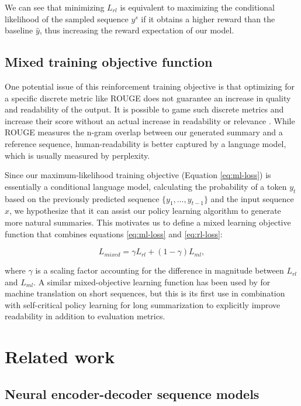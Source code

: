 We can see that minimizing $L_{rl}$ is equivalent to maximizing the conditional likelihood of the sampled sequence $y^{s}$ if it obtains a higher reward than the baseline $\hat{y}$, thus increasing the reward expectation of our model.

\subsection{Mixed training objective function}

One potential issue of this reinforcement training objective is that optimizing for a specific discrete metric like ROUGE does not guarantee an increase in quality and readability of the output. It is possible to game such discrete metrics and increase their score without an actual increase in readability or relevance \citep{liu2016}. While ROUGE measures the n-gram overlap between our generated summary and a reference sequence, human-readability is better captured by a language model, which is usually measured by perplexity.

Since our maximum-likelihood training objective (Equation \ref{eq:ml-loss}) is essentially a conditional language model, calculating the probability of a token $y_t$ based on the previously predicted sequence $\{y_1, \ldots, y_{t-1} \}$ and the input sequence $x$, we hypothesize that it can assist our policy learning algorithm to generate more natural summaries. This motivates us to define a mixed learning objective function that combines equations \ref{eq:ml-loss} and \ref{eq:rl-loss}:

\begin{equation}
L_{mixed} = \gamma L_{rl} + (1 - \gamma) L_{ml},
\label{eq:mixed-loss}
\end{equation}

where $\gamma$ is a scaling factor accounting for the difference in magnitude between $L_{rl}$ and $L_{ml}$. A similar mixed-objective learning function has been used by \citet{wu2016} for machine translation on short sequences, but this is its first use in combination with self-critical policy learning for long summarization to explicitly improve readability in addition to evaluation metrics.

\section{Related work}
\label{sec:related-work}

\subsection{Neural encoder-decoder sequence models}
\label{ssec:neural-sequence-models}

